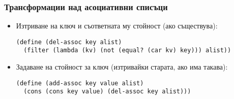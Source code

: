 \documentclass[alsotrans]{beamerswitch}
\begin{document}
\begin{frame}[fragile]
  \frametitle{Трансформации над асоциативни списъци}

  \begin{itemize}[<+->]
  \item Изтриване на ключ и съответната му стойност (ако съществува):\\
    \onslide<+->
\begin{lstlisting}
(define (del-assoc key alist)
  (filter (lambda (kv) (not (equal? (car kv) key))) alist))
\end{lstlisting}
  \item Задаване на стойност за ключ (изтривайки старата, ако има такава):\\
    \onslide<+->
\begin{lstlisting}
(define (add-assoc key value alist)
  (cons (cons key value) (del-assoc key alist)))
\end{lstlisting}
  \end{itemize}
\end{frame}
\begin{comment}
\begin{frame}[fragile]
  \frametitle{Задаване на стойност за ключ}
\small
  \textbf{Вариант №1 (грозен и по-бърз):}
\begin{lstlisting}
(define (add-key-value key value alist)
   (let ((new-kv (cons key value)))
        (cond ((null? alist) (list new-kv))
              ((eqv? (caar alist) key)
               (cons new-kv (cdr alist)))
              (else (cons (car alist)
                    (add-key-value key value (cdr alist))))))
\end{lstlisting}
  \pause
  \textbf{Вариант №2 (красив и по-бавен):}
\begin{lstlisting}
(define (add-key-value key value alist)
  (let ((new-kv (cons key value)))
       (if (assq key alist)
           (map (lambda (kv) (if (eq? (car kv) key)
                                 new-kv kv)) alist)
           (cons new-kv alist))))
\end{lstlisting}
\end{frame}
\end{comment}
\end{document}
